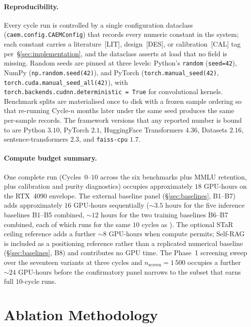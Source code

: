 \paragraph{Reproducibility.}
Every cycle run is controlled by a single configuration dataclass
(\texttt{caem.config.CAEMConfig}) that records every numeric constant
in the system; each constant carries a literature~[LIT], design~[DES],
or calibration~[CAL] tag per~\S\ref{sec:implementation}, and the
dataclass asserts at load that no field is missing. Random seeds are
pinned at three levels: Python's \texttt{random} (\texttt{seed=42}),
NumPy (\texttt{np.random.seed(42)}), and PyTorch
(\texttt{torch.manual\_seed(42)}, \texttt{torch.cuda.manual\_seed\_all(42)}),
with \texttt{torch.backends.cudnn.deterministic = True} for
convolutional kernels. Benchmark splits are materialised once to
disk with a frozen sample ordering so that re-running Cycle-$n$ months
later under the same seed produces the same per-sample records. The
framework versions that any reported number is bound to are Python
$3.10$, PyTorch $2.1$, HuggingFace Transformers $4.36$, Datasets
$2.16$, sentence-transformers $2.3$, and \texttt{faiss-cpu} $1.7$.

\paragraph{Compute budget summary.}
One complete \caem{} run (Cycles~$0$--$10$ across the six benchmarks
plus MMLU retention, plus calibration and purity diagnostics) occupies
approximately $18$ GPU-hours on the RTX~4090 envelope. The external
baseline panel (\S\ref{sec:baselines}, B1--B7) adds approximately
$16$ GPU-hours sequentially ($\sim 3.5$ hours for the five inference
baselines B1--B5 combined, $\sim 12$ hours for the two training
baselines B6--B7 combined, each of which runs for the same $10$
cycles as \caem{}). The optional STaR ceiling reference adds a further
$\sim 8$ GPU-hours when compute permits; Self-RAG is included as a
positioning reference rather than a replicated numerical baseline
(\S\ref{sec:baselines}, B8) and contributes no GPU time. The Phase~1
screening sweep over the seventeen variants at three
cycles and $n_{\text{screen}} = 1\,500$ occupies a further $\sim 24$
GPU-hours before the confirmatory panel narrows to the subset that
earns full $10$-cycle runs.

\section{Ablation Methodology}
\label{sec:ablation}

